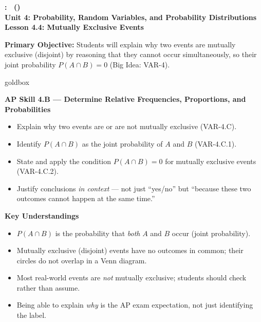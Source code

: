 \documentclass[10pt]{article}
\newcommand{\UnitNumberName}{Unit 4: Probability, Random Variables, and Probability Distributions \quad}
\newcommand{\LessonNumberName}{Lesson 4.4: Mutually Exclusive Events}
\begin{document}
\begin{center}
    {\Large\bfseries \CourseName: \SchoolYear\ (\MeetingLength) \\
    {\small\bfseries \UnitNumberName \LessonNumberName}}
\end{center}

\begin{tcolorbox}[colback=sky, colframe=navy, boxrule=0.9pt, arc=2mm,
    left=2mm, right=2mm, top=1.5mm, bottom=1.5mm]
    \textbf{Primary Objective:} Students will explain why two events are mutually exclusive
    (disjoint) by reasoning that they cannot occur simultaneously, so their joint probability
    $P(A \cap B) = 0$ (Big Idea: VAR-4).
\end{tcolorbox}

\renewcommand{\arraystretch}{1.6}
\begin{skillbox}{goldbox}
\begin{minipage}[t]{0.48\linewidth}
    \textbf{AP Skill 4.B --- Determine Relative Frequencies, Proportions, and Probabilities}
    \begin{itemize}
        \item Explain why two events are or are not mutually exclusive (VAR-4.C).
        \item Identify $P(A \cap B)$ as the joint probability of $A$ and $B$
              (VAR-4.C.1).
        \item State and apply the condition $P(A \cap B) = 0$ for mutually exclusive
              events (VAR-4.C.2).
        \item Justify conclusions \emph{in context} --- not just ``yes/no'' but
              ``because these two outcomes cannot happen at the same time.''
    \end{itemize}
\end{minipage}
\hfill
\begin{minipage}[t]{0.48\linewidth}
    \textbf{Key Understandings}
    \begin{itemize}
        \item $P(A \cap B)$ is the probability that \emph{both} $A$ and $B$ occur (joint probability).
        \item Mutually exclusive (disjoint) events have no outcomes in common; their circles do not overlap in a Venn diagram.
        \item Most real-world events are \emph{not} mutually exclusive; students should check rather than assume.
        \item Being able to explain \emph{why} is the AP exam expectation, not just identifying the label.
    \end{itemize}
\end{minipage}
\end{skillbox}
\end{document}
